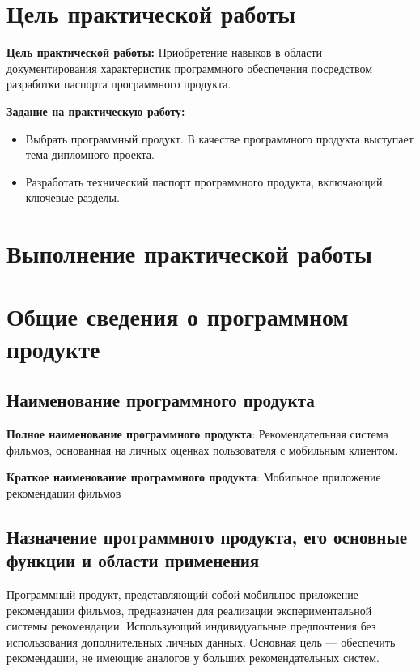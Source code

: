 \section*{\LARGE Цель практической работы}

\textbf{Цель практической работы:}
Приобретение навыков в области документирования характеристик
программного обеспечения посредством разработки
паспорта программного продукта.

\textbf{Задание на практическую работу:}

\begin{itemize}
    \item Выбрать программный продукт. В качестве программного продукта
    выступает тема дипломного проекта.
    \item Разработать технический паспорт программного продукта,
    включающий ключевые разделы.
\end{itemize}

\clearpage

\section*{\LARGE Выполнение практической работы}

\section{Общие сведения о программном продукте}
\subsection{Наименование программного продукта}

\textbf{Полное наименование программного продукта}:
Рекомендательная система фильмов, основанная на личных оценках пользователя с мобильным клиентом.\par
\textbf{Краткое наименование программного продукта}:
Мобильное приложение рекомендации фильмов

\subsection{Назначение программного продукта,
    его основные функции и области применения}
Программный продукт, представляющий собой мобильное приложение рекомендации фильмов, предназначен для реализации
экспериментальной системы рекомендации.
Использующий индивидуальные предпочтения без использования дополнительных личных данных.
Основная цель --- обеспечить рекомендации, не имеющие аналогов у больших рекомендательных систем.

